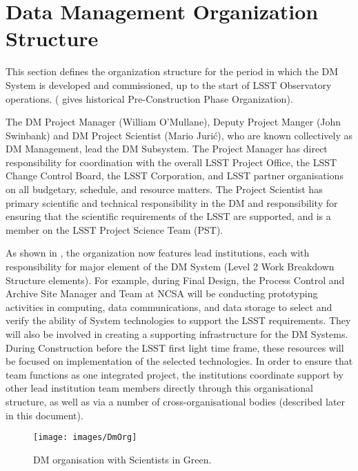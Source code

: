 

\section{Data Management Organization Structure}
This section defines the organization structure for the period in which the DM System is developed and commissioned, up to the start of LSST Observatory operations.  
( gives historical  Pre-Construction Phase Organization).

The DM Project Manager (William O'Mullane), Deputy Project Manger (John Swinbank)   and DM Project Scientist (Mario Juri\'c), who are known collectively as DM Management, lead the DM Subsystem.  The Project Manager has direct responsibility for coordination with the overall LSST Project Office, the LSST Change Control Board, the LSST Corporation, and LSST partner organisations on all budgetary, schedule, and resource matters.  The Project Scientist has primary scientific and technical responsibility in the DM and responsibility for ensuring that the scientific requirements of the LSST are supported, and is a member on the LSST Project Science Team (PST). 

As shown in , the organization now features lead institutions, each with responsibility for major element of the DM System (Level 2 Work Breakdown Structure elements).  For example, during Final Design, the Process Control and Archive Site Manager and Team at NCSA will be conducting prototyping activities in computing, data communications, and data storage to select and verify the ability of System technologies to support the LSST requirements.  They will also be involved in creating a supporting infrastructure for the DM Systems.  During Construction before the LSST first light time frame, these resources will be focused on implementation of the selected technologies.  In order to ensure that team functions as one integrated project, the institutions coordinate support by other lead institution team members directly through this organisational structure, as well as via a number of cross-organisational bodies (described later in this document). 

\begin{figure}[htbp]
\begin{center}
 \texttt{[image: images/DmOrg]}
\caption{DM organisation with Scientists in Green. \label{fig:dmorg}}
\end{center}
\end{figure}


